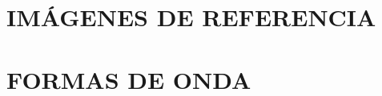 \documentclass[a4paper, 12pt, final]{article}
\begin{document}
\section{IMÁGENES DE REFERENCIA}


\section{FORMAS DE ONDA}
\label{sec:formas}
\end{document}
